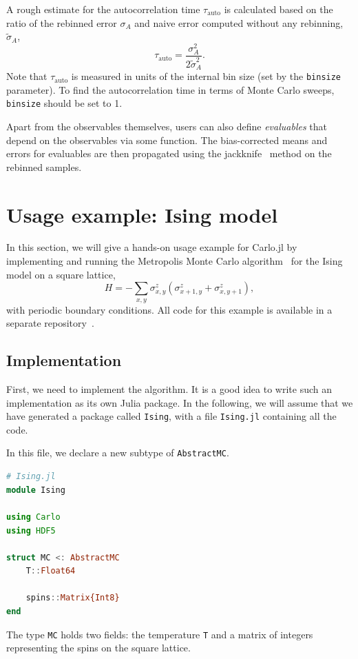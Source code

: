 \documentclass{SciPost}
\begin{document}
A rough estimate for the autocorrelation time $\tau_\text{auto}$ is calculated based on the ratio of the rebinned error $\sigma_A$ and naive error computed without any rebinning, $\tilde{\sigma}_A$,~\cite{Ambegaokar2010}
\begin{equation}
\label{eq:autocorr}
\tau_\text{auto} = \frac{\sigma_A^2}{2\tilde{\sigma}^2_A}.
\end{equation}
Note that $\tau_\text{auto}$ is measured in units of the internal bin size (set by the \texttt{binsize} parameter). To find the autocorrelation time in terms of Monte Carlo sweeps, \texttt{binsize} should be set to 1.

 Apart from the observables themselves, users can also define \textit{evaluables} that depend on the observables via some function. The bias-corrected means and errors for evaluables are then 
propagated using the jackknife~\cite{Miller1974} method on the rebinned samples.
\section{Usage example: Ising model}
\label{sec:ising}
In this section, we will give a hands-on usage example for Carlo.jl by implementing and running the Metropolis Monte Carlo algorithm~\cite{Metropolis1953} for the Ising model on a square lattice,
\begin{equation}
H = -\sum_{x,y} \sigma^z_{x,y} (\sigma^z_{x+1,y} + \sigma^z_{x,y+1}),
\end{equation}
with periodic boundary conditions.
All code for this example is available in a separate repository~\cite{IsingExample}.

\subsection{Implementation}
First, we need to implement the algorithm. It is a good idea to write such an implementation as its own Julia package. In the following, we will assume that we have generated a package called \texttt{Ising}, with a file \texttt{Ising.jl} containing all the code.

In this file, we declare a new subtype of \texttt{AbstractMC}.
\begin{lstlisting}[language=julia]
# Ising.jl
module Ising

using Carlo
using HDF5

struct MC <: AbstractMC
    T::Float64

    spins::Matrix{Int8}
end
\end{lstlisting}
The type \texttt{MC} holds two fields: the temperature \texttt{T} and a matrix of integers representing the spins on the square lattice.
\end{document}
